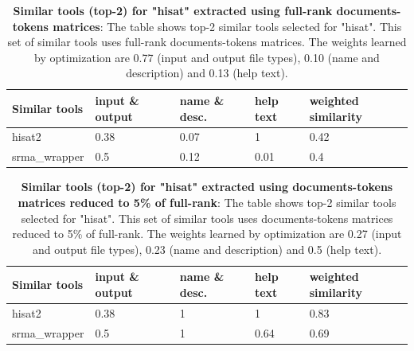 \begin{table}[ht]
\begin{center}
    \begin{tabular}{|l|l|l|l|l|}
        \hline
        Similar tools & input \& output & name \& desc. & help text & weighted similarity \\ \hline
        hisat2   & 0.38 & 0.07 & 1 & 0.42  \\ \hline
        srma\_wrapper & 0.5 & 0.12 & 0.01 & 0.4 \\ \hline
    \end{tabular}
    \end{center}
    \caption[Similar tools (top-2) for "hisat" extracted using full-rank documents-tokens matrices]{\textbf{Similar tools (top-2) for "hisat" extracted using full-rank documents-tokens matrices}: The table shows top-2 similar tools selected for "hisat". This set of similar tools uses full-rank documents-tokens matrices. The weights learned by optimization are 0.77 (input and output file types), 0.10 (name and description) and 0.13 (help text). }
    \label{tab:accuracy}
\end{table}

\begin{table}[ht]
\begin{center}
    \begin{tabular}{|l|l|l|l|l|}
        \hline
        Similar tools   & input \& output & name \& desc. & help text & weighted similarity \\ \hline
        hisat2   & 0.38 & 1 & 1 & 0.83 \\ \hline
        srma\_wrapper & 0.5 & 1 & 0.64 & 0.69 \\ \hline
    \end{tabular}
    \end{center}
    \caption[Similar tools (top-2) for "hisat" extracted using documents-tokens matrices reduced to 5\% of full-rank]{\textbf{Similar tools (top-2) for "hisat" extracted using documents-tokens matrices reduced to 5\% of full-rank}: The table shows top-2 similar tools selected for "hisat". This set of similar tools uses documents-tokens matrices reduced to 5\% of full-rank. The weights learned by optimization are 0.27 (input and output file types), 0.23 (name and description) and 0.5 (help text).}
    \label{tab:accuracy}
\end{table}

